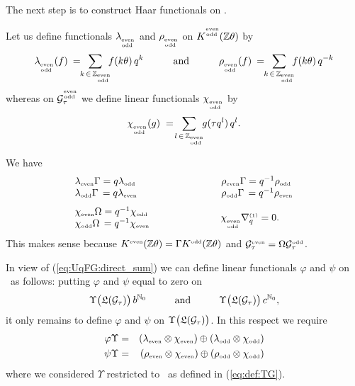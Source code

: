 The next step is to construct Haar functionals on \UqTG\@.
\begin{defn*} \label{def:lam_rho_chi}
Let us define functionals $\lambda_{_{\stackrel{\scriptscriptstyle \rm even}{\scriptscriptstyle \! \rm odd}}}$ and
$\rho_{_{\stackrel{\scriptscriptstyle \rm even}{\scriptscriptstyle \! \rm odd}}}$ on $K^{\stackrel{\scriptscriptstyle \rm even}{\scriptscriptstyle \! \rm odd}}(\mathbb{Z} \theta)$ by
$$ \displaystyle
     \lambda_{_\evenodd}(f)\: = \!\! \sum_{k\,\in\,\ZZ_\evenodd}
        \hspace{-0.4em}  f(k\theta)\,q^k
   \andspace{3em}
     \rho_{_\evenodd}(f)   \: = \!\! \sum_{k\,\in\,\ZZ_\evenodd}
        \hspace{-0.4em}  f(k\theta)\,q^{-k}  $$
whereas on $\mathcal G_\tau^{\stackrel{\scriptscriptstyle \rm even}{\scriptscriptstyle \! \rm odd}}$ we define linear functionals $\chi_{_{\stackrel{\scriptscriptstyle \rm even}{\scriptscriptstyle \! \rm odd}}}$ by
$$  \chi_{_{\stackrel{\scriptscriptstyle \rm even}{\scriptscriptstyle \! \rm odd}}}(g) \;= \! \sum_{l\,\in\,\mathbb{Z}_{\stackrel{\scriptscriptstyle \rm even}{\scriptscriptstyle \! \rm odd}}}
               \hspace{-0.3em} g(\tau q^l)\, q^l. $$
\end{defn*}


\begin{lemma} \label{lemma:lam_rho_chi_nabq}
We have
$$ \begin{array}{lcl}
   \begin{array}{l}
  \lameven\Gamma = q \lamodd  \\
  \lamodd\Gamma\,= q \lameven
\end{array} & \hspace{15mm}&
\begin{array}{l}
  \rhoeven\Gamma = q^{-1} \rhoodd  \\
  \rhoodd\Gamma\,= q^{-1} \rhoeven
\end{array} \\ \rule{0pt}{5ex}
\begin{array}{l}
  \chieven\Omega = q^{-1} \chiodd \\
  \chiodd\Omega\,= q^{-1} \chieven
\end{array} & &
\;\,\chi_{_\evenodd} \nabq{1} = 0.
\end{array}$$
\rm This makes sense because $K^{\rm \scriptscriptstyle even}(\mathbb{Z} \theta) = \Gamma K^{\rm \scriptscriptstyle odd}(\mathbb{Z} \theta)$ and $\mathcal G_\tau^{\rm \scriptscriptstyle even} = \Omega\mathcal G_\tau^{\rm \scriptscriptstyle odd}$.
\end{lemma}


\begin{defn}
In view of (\ref{eq:UqFG:direct_sum}) we can define
linear functionals $\varphi$ and $\psi$ on \UqTG\ as follows:
putting $\varphi$ and $\psi$ equal to zero on
\begin{equation} \label{eq:haar:Uq:zero}
    \Upsilon\!\left(\TG \vertM\right) b^{\NN_0}
       \andspace{10mm}
    \Upsilon\!\left(\TG \vertM\right) c^{\NN_0},
\end{equation}
it only remains to define $\varphi$ and $\psi$ on $\Upsilon\!\left(\TG \vertM\right)$.
In this respect we require
\begin{eqnarray} \label{eq:def:haar:Uq:phi}
   \varphi \Upsilon &=& (\lambda_{\rm \scriptscriptstyle even} \otimes \chi_{\rm \scriptscriptstyle even}) \oplus  (\lambda_{\rm \scriptscriptstyle odd} \otimes \chi_{\rm \scriptscriptstyle odd}) \\
   \psi \Upsilon    &=& (\rho_{\rm \scriptscriptstyle even} \otimes \chi_{\rm \scriptscriptstyle even}) \oplus (\rho_{\rm \scriptscriptstyle odd} \otimes \chi_{\rm \scriptscriptstyle odd})
\end{eqnarray}
where we considered $\Upsilon$ restricted to \TG\ as defined in (\ref{eq:def:TG}).
\end{defn}


